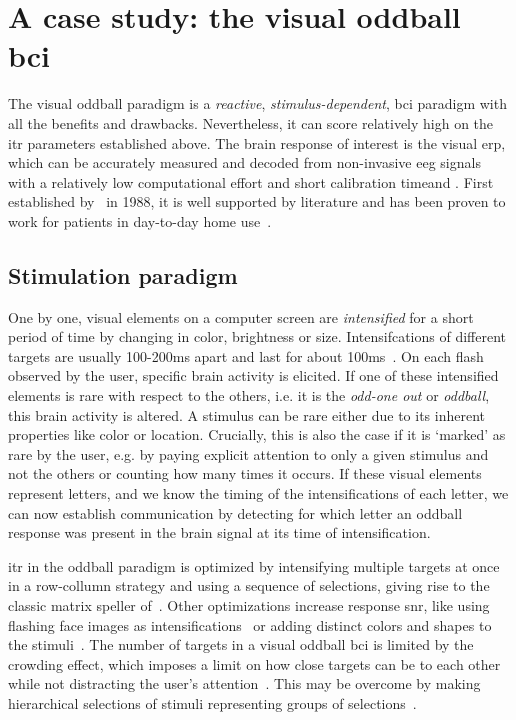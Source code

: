 \section{A case study: the visual oddball \ac{bci}}

The visual oddball paradigm is a \emph{reactive}, \emph{stimulus-dependent},
\ac{bci} paradigm with all the benefits and drawbacks.
Nevertheless, it can score relatively high on the \ac{itr} parameters established above.
The brain response of interest is the visual \ac{erp}, which can be accurately
measured and decoded from non-invasive \ac{eeg} signals with a relatively low
computational effort and short calibration timeand .
First established by~\cite{Farwell1988} in 1988, it is well supported by literature
and has been proven to work for patients in day-to-day home
use~\cite{Wolpaw2018}.

\subsection{Stimulation paradigm}
One by one, visual elements on a computer screen are \emph{intensified} for a
short period of time by changing in color, brightness or size.
Intensifcations of different targets are usually 100-200ms apart and last for about
100ms~\cite{Sellers2006a}.
On each flash observed by the user, specific brain activity is elicited.
If one of these intensified elements is rare with respect to the others, i.e. it is the
\emph{odd-one out} or \emph{oddball}, this brain activity is altered.
A stimulus can be rare either due to its inherent properties like color or
location.
Crucially, this is also the case if it is `marked' as rare by the user, e.g.
by paying explicit attention to only a given stimulus and not the others or
counting how many times it occurs.
If these visual elements represent letters, and we know the timing of the
intensifications of each letter, we can now establish communication by detecting
for which letter an oddball response was present in the brain signal at its
time of intensification.

\Ac{itr} in the oddball paradigm is optimized by intensifying
multiple targets at once in a row-collumn strategy and using a sequence of
selections, giving rise to the classic matrix speller of~\cite{Farwell1988}.
Other optimizations increase response \ac{snr}, like using flashing face
images as intensifications~\cite{Jin2012} or adding distinct colors and shapes to the
stimuli~\cite{Treder2011}.
The number of targets in a visual oddball \ac{bci} is limited by the crowding
effect, which imposes a limit on how close targets can be to each other while
not distracting the user's attention~\cite{Sellers2006a,Li2010}.
This may be overcome by making hierarchical selections of stimuli representing
groups of selections~\cite{Treder2010}.

